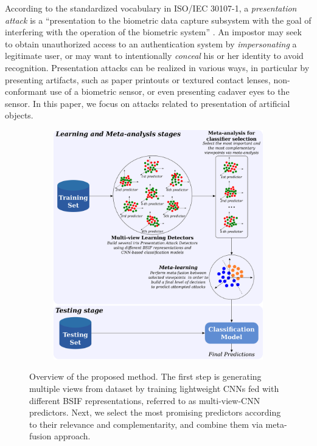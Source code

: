 According to the standardized vocabulary in ISO/IEC 30107-1, a \emph{presentation attack} is a ``presentation to the biometric data capture subsystem with the goal of interfering with the operation of the biometric system'' \cite{ISO_30107-1_2016}. An impostor may seek to obtain unauthorized access to an authentication system by \emph{impersonating} a legitimate user, or may want to intentionally \emph{conceal} his or her identity to avoid recognition. Presentation attacks can be realized in various ways, in particular by presenting artifacts, such as paper printouts or textured contact lenses, non-conformant use of a biometric sensor, or even presenting cadaver eyes to the sensor. In this paper, we focus on attacks related to presentation of artificial objects.
%
\begin{figure}[!tb]
    \centering
    \begin{subfigure}[b]{0.99\linewidth}
        \includegraphics[width=\linewidth]{graphics/method-overview-v4.pdf}
    \end{subfigure}
    \caption{Overview of the proposed method. The first step is generating multiple views from dataset by training lightweight CNNs fed with different BSIF representations, referred to as multi-view-CNN predictors. Next, we select the most promising predictors according to their relevance and complementarity, and combine them via meta-fusion approach. 
    }
    \label{fig:method_overview}
\end{figure}


